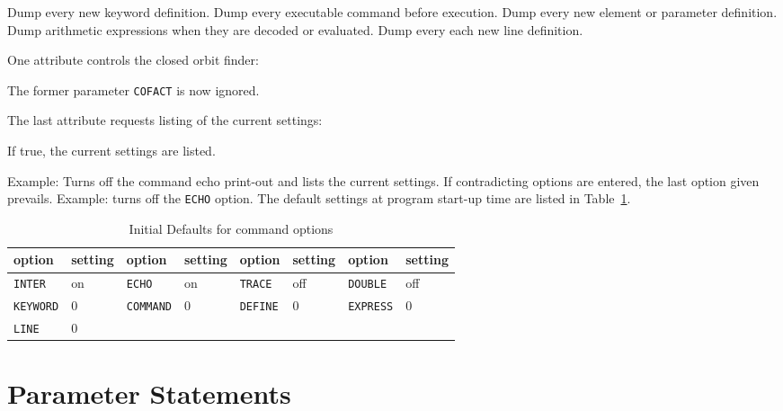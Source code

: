 \begin{mylist}
Dump every new keyword definition.
Dump every executable command before execution.
Dump every new element or parameter definition.
Dump arithmetic expressions when they are decoded or evaluated.
Dump every each new line definition.
\end{mylist}
One attribute controls the closed orbit finder:
\begin{mylist}
The former parameter {\tt COFACT} is now ignored.
\end{mylist}
The last attribute requests listing of the current settings:
\begin{mylist}
If true, the current settings are listed.
\end{mylist}
Example:
Turns off the command echo print-out and lists the current settings.
If contradicting options are entered, the last option given prevails.
Example:
turns off the {\tt ECHO} option.
The default settings at program start-up time are listed in
Table~\ref{T-OPT}.
\begin{table}[ht]
\caption{Initial Defaults for command options}
\vspace{1ex}
\label{T-OPT}
\centering
\begin{tabular}{|l|l||l|l||l|l||l|l|}
\hline
option &setting &option &setting &option &setting &option &setting \\
\hline
{\tt INTER}  &on &{\tt ECHO}   &on & {\tt TRACE} &off &{\tt DOUBLE} &off \\
{\tt KEYWORD}&0  &{\tt COMMAND}&0  & {\tt DEFINE}&0   &{\tt EXPRESS}&0 \\
{\tt LINE}   &0  &             &   &             &    &             & \\
\hline
\end{tabular}
\end{table}
 
\section{Parameter Statements}

